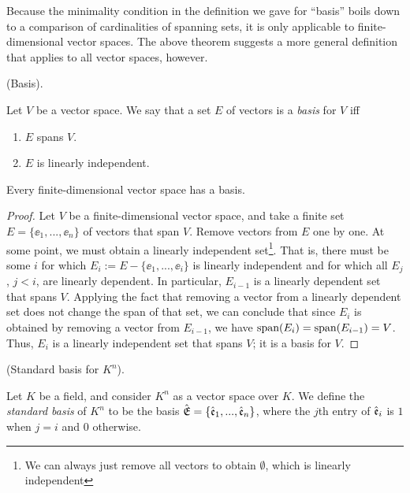 Because the minimality condition in the definition we gave for ``basis'' boils down to a comparison of cardinalities of spanning sets, it is only applicable to finite-dimensional vector spaces. The above theorem suggests a more general definition that applies to all vector spaces, however.

\begin{defn}
    (Basis).
    
    Let $V$ be a vector space. We say that a set $E$ of vectors is a \textit{basis} for $V$ iff
   
   \begin{enumerate}
        \item $E$ spans $V$.
        \item $E$ is linearly independent.
    \end{enumerate}
\end{defn}

\begin{theorem}
    Every finite-dimensional vector space has a basis.
\end{theorem}

\begin{proof}
    Let $V$ be a finite-dimensional vector space, and take a finite set $E = \{\ee_1, ..., \ee_n\}$ of vectors that span $V$. Remove vectors from $E$ one by one. At some point, we must obtain a linearly independent set\footnote{We can always just remove all vectors to obtain $\emptyset$, which is linearly independent}. That is, there must be some $i$ for which $E_i := E - \{\ee_1, ..., \ee_i\}$ is linearly independent and for which all $E_j$, $j < i$, are linearly dependent. In particular, $E_{i - 1}$ is a linearly dependent set that spans $V$. Applying the fact that removing a vector from a linearly dependent set does not change the span of that set, we can conclude that since $E_i$ is obtained by removing a vector from $E_{i - 1}$, we have $\text{span}(E_i) = \text{span}(E_{i - 1}) = V$. Thus, $E_i$ is a linearly independent set that spans $V$; it is a basis for $V$.
\end{proof}

\begin{defn}
    (Standard basis for $K^n$).
    
    Let $K$ be a field, and consider $K^n$ as a vector space over $K$. We define the \textit{standard basis} of $K^n$ to be the basis ${\hat{\mathfrak{E}}} = \{\hat{\mathfrak{e}}_1, ..., \hat{\mathfrak{e}}_n\}$, where the $j$th entry of $\hat{\mathfrak{e}}_i$ is $1$ when $j = i$ and $0$ otherwise.
\end{defn}


